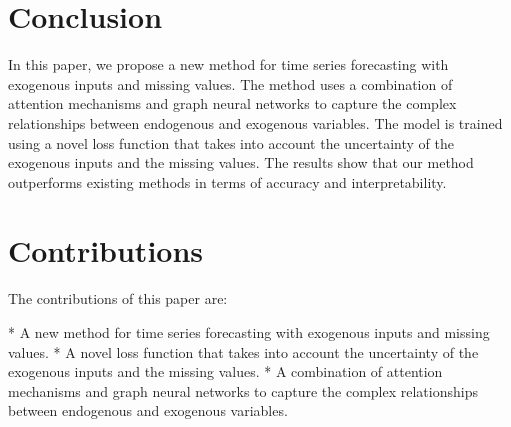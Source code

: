 \documentclass{article}
\begin{document}
\section{Conclusion}
In this paper, we propose a new method for time series forecasting with exogenous inputs and missing values. The method uses a combination of attention mechanisms and graph neural networks to capture the complex relationships between endogenous and exogenous variables. The model is trained using a novel loss function that takes into account the uncertainty of the exogenous inputs and the missing values. The results show that our method outperforms existing methods in terms of accuracy and interpretability.

\section{Contributions}
The contributions of this paper are:

* A new method for time series forecasting with exogenous inputs and missing values.
* A novel loss function that takes into account the uncertainty of the exogenous inputs and the missing values.
* A combination of attention mechanisms and graph neural networks to capture the complex relationships between endogenous and exogenous variables.
\end{document}
